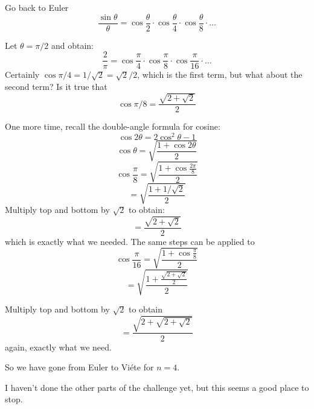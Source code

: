 \documentclass[11pt, oneside]{article}
\begin{document}
Go back to Euler 
\[ \frac{\sin \theta}{\theta} = \cos \frac{\theta}{2} \cdot \cos \frac{\theta}{4} \cdot  \cos \frac{\theta}{8} \cdot \dots \]

Let $\theta = \pi/2$ and obtain:
\[ \frac{2}{\pi} = \cos \frac{\pi}{4} \cdot \cos \frac{\pi}{8} \cdot  \cos \frac{\pi}{16} \cdot \dots \]
Certainly $\cos \pi / 4 =  1/ \sqrt{2} = \sqrt{2}/2$, which is the first term, but what about the second term?  Is it true that
\[ \cos \pi/8 = \frac{\sqrt{2 + \sqrt{2}}}{2} \]

One more time, recall the double-angle formula for cosine:
\[ \cos 2 \theta = 2 \cos^2 \theta - 1 \]
\[ \cos \theta = \sqrt{\frac{1 + \cos 2 \theta}{2}} \]
\[ \cos \frac{\pi}{8} = \sqrt{\frac{1 + \cos \frac{2 \pi}{8}} {2}} \]
\[ = \sqrt{\frac{1 + 1/\sqrt{2}}{2}}\]
Multiply top and bottom by $\sqrt{2}$ to obtain:
\[ = \frac{\sqrt{2 + \sqrt{2}}}{2} \]
which is exactly what we needed.  The same steps can be applied to 
\[ \cos \frac{\pi}{16} = \sqrt{\frac{1 + \cos \frac{\pi}{8}} {2}} \]
\[ =  \sqrt{\frac{1 + \frac{\sqrt{2 + \sqrt{2}}}{2}} {2}} \]

Multiply top and bottom by $\sqrt{2}$ to obtain
\[ =  \frac{\sqrt{2 + \sqrt{2 + \sqrt{2}}}} {2} \]
again, exactly what we need.

So we have gone from Euler to Vi\'ete for $n=4$.

I haven't done the other parts of the challenge yet, but this seems a good place to stop.
\end{document}
